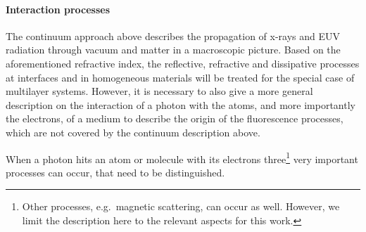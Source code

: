 \paragraph{Interaction processes}
The continuum approach above describes the propagation of x-rays and EUV radiation through vacuum and matter in a macroscopic picture. Based on the aforementioned refractive index, the reflective, refractive and dissipative processes at interfaces and in homogeneous materials will be treated for the special case of multilayer systems. However, it is necessary to also give a more general description on the interaction of a photon with the atoms, and more importantly the electrons, of a medium to describe the origin of the fluorescence processes, which are not covered by the continuum description above.

When a photon hits an atom or molecule with its electrons three\footnote{Other processes, e.g.~magnetic scattering, can occur as well. However, we limit the description here to the relevant aspects for this work.} very important processes can occur, that need to be distinguished.
